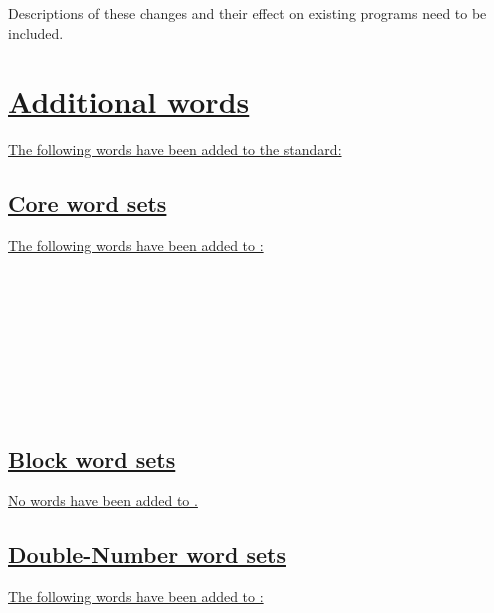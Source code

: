 \begin{editor}
\begin{description}
Descriptions of these changes and their effect on existing programs
need to be included.
\end{description}
\end{editor}

\vfill
\newpage

\cbstart{}
\section[Additional words]{\uline{Additional words}}
\label{diff:new12}

\uline{The following words have been added to the standard:}

\setcounter{subsection}{5}
\subsection[Core word sets]{\uline{Core word sets}}
\uline{The following words have been added to :}

\begin{minipage}[t]{0.3\linewidth}
\uline{} \\
\uline{} \\
\uline{}
\end{minipage}
\hfill
\begin{minipage}[t]{0.3\linewidth}
\uline{} \\
\uline{} \\
\uline{}
\end{minipage}
\hfill
\begin{minipage}[t]{0.3\linewidth}
\uline{} \\
\uline{} \\
\uline{}
\end{minipage}


\subsection[{Block word sets}]{\uline{Block word sets}}
\uline{No words have been added to .}

\subsection[{Double-Number word sets}]{\uline{Double-Number word sets}}
\uline{The following words have been added to :}

